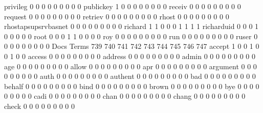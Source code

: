 \documentclass[compress,8pt]{beamer}
\begin{document}
\begin{frame}
\begin{Schunk}
  privileg                                   0   0   0   0   0   0   0   0   0
  publickey                                  1   0   0   0   0   0   0   0   0
  receiv                                     0   0   0   0   0   0   0   0   0
  request                                    0   0   0   0   0   0   0   0   0
  retriev                                    0   0   0   0   0   0   0   0   0
  rhost                                      0   0   0   0   0   0   0   0   0
  rhostapsupsrvbasnet                        0   0   0   0   0   0   0   0   0
  richard                                    1   1   0   0   0   1   1   1   1
  richarduid                                 0   0   0   1   0   0   0   0   0
  root                                       0   0   0   1   1   0   0   0   0
  roy                                        0   0   0   0   0   0   0   0   0
  run                                        0   0   0   0   0   0   0   0   0
  ruser                                      0   0   0   0   0   0   0   0   0
                                          Docs
Terms                                      739 740 741 742 743 744 745 746 747
  accept                                     1   0   0   1   0   0   1   0   0
  access                                     0   0   0   0   0   0   0   0   0
  address                                    0   0   0   0   0   0   0   0   0
  admin                                      0   0   0   0   0   0   0   0   0
  age                                        0   0   0   0   0   0   0   0   0
  allow                                      0   0   0   0   0   0   0   0   0
  apr                                        0   0   0   0   0   0   0   0   0
  argument                                   0   0   0   0   0   0   0   0   0
  auth                                       0   0   0   0   0   0   0   0   0
  authent                                    0   0   0   0   0   0   0   0   0
  bad                                        0   0   0   0   0   0   0   0   0
  behalf                                     0   0   0   0   0   0   0   0   0
  bind                                       0   0   0   0   0   0   0   0   0
  brown                                      0   0   0   0   0   0   0   0   0
  bye                                        0   0   0   0   0   0   0   0   0
  cadi                                       0   0   0   0   0   0   0   0   0
  chan                                       0   0   0   0   0   0   0   0   0
  chang                                      0   0   0   0   0   0   0   0   0
  check                                      0   0   0   0   0   0   0   0   0

\end{Schunk}
\end{frame}
\end{document}
